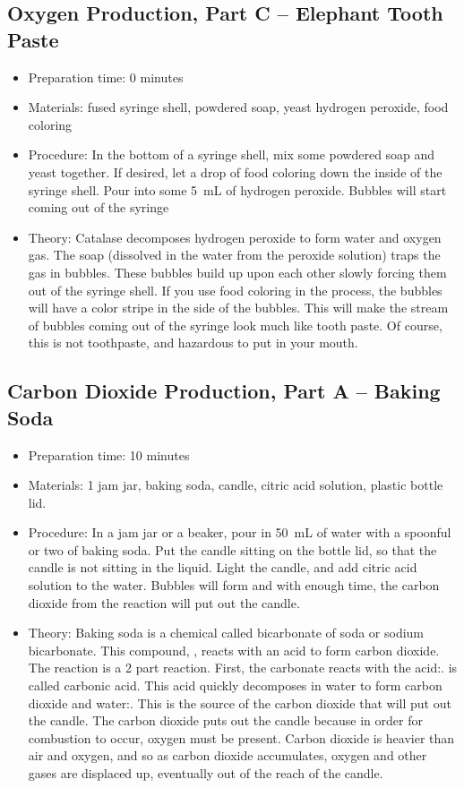 \subsection{Oxygen Production, Part C -- Elephant Tooth Paste}
\begin{itemize}
\item{Preparation time: 0 minutes}
\item{Materials: fused syringe shell, powdered soap, yeast hydrogen peroxide, food coloring}
\item{Procedure: In the bottom of a syringe shell, mix some powdered soap and yeast together. If desired, let a drop of food coloring down the inside of the syringe shell. Pour into some 5~mL of hydrogen peroxide. Bubbles will start coming out of the syringe}
\item{Theory: Catalase decomposes hydrogen peroxide to form water and oxygen gas. The soap (dissolved in the water from the peroxide solution) traps the gas in bubbles. These bubbles build up upon each other slowly forcing them out of the syringe shell. If you use food coloring in the process, the bubbles will have a color stripe in the side of the bubbles. This will make the stream of bubbles coming out of the syringe look much like tooth paste. Of course, this is not toothpaste, and hazardous to put in your mouth.}
\end{itemize}

\subsection{Carbon Dioxide Production, Part A -- Baking Soda}
\begin{itemize}
\item{Preparation time: 10 minutes}
\item{Materials: 1 jam jar, baking soda, candle, citric acid solution, plastic bottle lid.}
\item{Procedure: In a jam jar or a beaker, pour in 50~mL of water with a spoonful or two of baking soda. Put the candle sitting on the bottle lid, so that the candle is not sitting in the liquid. Light the candle, and add citric acid solution to the water. Bubbles will form and with enough time, the carbon dioxide from the reaction will put out the candle.}
\item{Theory: Baking soda is a chemical called bicarbonate of soda or sodium bicarbonate. This compound, , reacts with an acid to form carbon dioxide. The reaction is a 2 part reaction. First, the carbonate reacts with the acid:.  is called carbonic acid. This acid quickly decomposes in water to form carbon dioxide and water:. This is the source of the carbon dioxide that will put out the candle. The carbon dioxide puts out the candle because in order for combustion to occur, oxygen must be present. Carbon dioxide is heavier than air and oxygen, and so as carbon dioxide accumulates, oxygen and other gases are displaced up, eventually out of the reach of the candle.}
\end{itemize}

